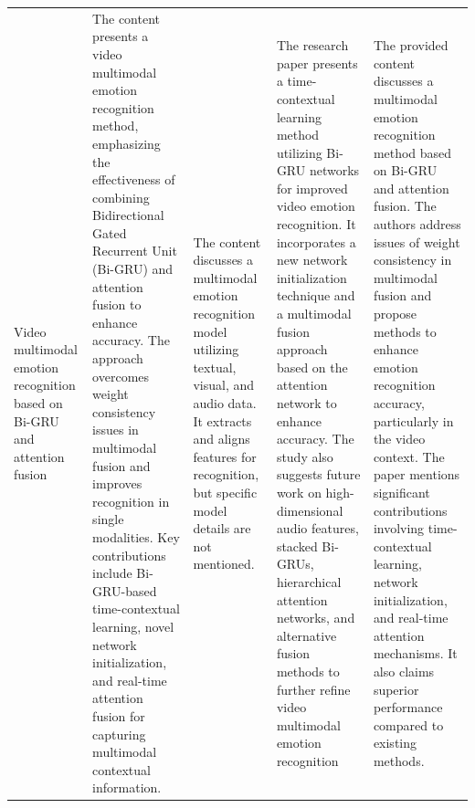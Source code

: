 \documentclass[conference]{IEEEtran}
\begin{document}
\begin{longtable}
\begin{tabularx}{\textwidth}{|>{\raggedright\arraybackslash}X|>{\raggedright\arraybackslash}X|>{\raggedright\arraybackslash}X|>{\raggedright\arraybackslash}X|>{\raggedright\arraybackslash}X|}
\hline
Video multimodal emotion recognition based on Bi-GRU and attention fusion & The content presents a video multimodal emotion recognition method, emphasizing the effectiveness of combining Bidirectional Gated Recurrent Unit (Bi-GRU) and attention fusion to enhance accuracy. The approach overcomes weight consistency issues in multimodal fusion and improves recognition in single modalities. Key contributions include Bi-GRU-based time-contextual learning, novel network initialization, and real-time attention fusion for capturing multimodal contextual information. & The content discusses a multimodal emotion recognition model utilizing textual, visual, and audio data. It extracts and aligns features for recognition, but specific model details are not mentioned. &The research paper presents a time-contextual learning method utilizing Bi-GRU networks for improved video emotion recognition. It incorporates a new network initialization technique and a multimodal fusion approach based on the attention network to enhance accuracy. The study also suggests future work on high-dimensional audio features, stacked Bi-GRUs, hierarchical attention networks, and alternative fusion methods to further refine video multimodal emotion recognition&The provided content discusses a multimodal emotion recognition method based on Bi-GRU and attention fusion. The authors address issues of weight consistency in multimodal fusion and propose methods to enhance emotion recognition accuracy, particularly in the video context. The paper mentions significant contributions involving time-contextual learning, network initialization, and real-time attention mechanisms. It also claims superior performance compared to existing methods. \\


\end{tabularx}
\end{longtable}
\end{document}
